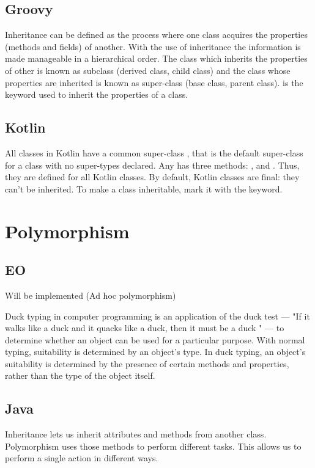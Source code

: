 \documentclass[12pt]{book}
\begin{document}
{{\subsection{Groovy}
Inheritance can be defined as the process where one class acquires the properties (methods and fields) of another. With the use of inheritance the information is made manageable in a hierarchical order. The class which inherits the properties of other is known as subclass (derived class, child class) and the class whose  properties are inherited is known as super-class (base class, parent class).  is the keyword used to inherit the properties of a class.

\subsection{Kotlin}
All classes in Kotlin have a common super-class , that is the default super-class for a class with no super-types declared. Any has three methods: ,  and . Thus, they are defined for all Kotlin classes. By default, Kotlin classes are final: they can’t be inherited. To make a class inheritable, mark it with the  keyword.

\section{Polymorphism}

\subsection{EO}
Will be implemented (Ad hoc polymorphism)

Duck typing in computer programming is an application of the duck test — "If it walks like a duck and it quacks like a duck, then it must be a duck " — to determine whether  an object can be used for a particular purpose.  With normal typing, suitability is determined by an object's type. In duck typing, an object's suitability is determined by the presence  of certain methods and properties, rather than the type of the object itself.

\subsection{Java}
Inheritance lets us inherit attributes and methods from another class. Polymorphism uses those methods to perform different tasks. This allows us to perform a single action in different ways.

}}
\end{document}
